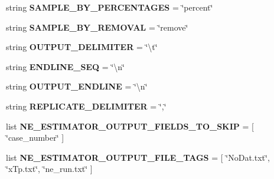\begin{DoxyCompactItemize}
\item 
string {\bfseries S\+A\+M\+P\+L\+E\+\_\+\+B\+Y\+\_\+\+P\+E\+R\+C\+E\+N\+T\+A\+G\+ES} = \char`\"{}percent\char`\"{}\hypertarget{namespacenegui_1_1pgdriveneestimator_a6ee69b369b673a4e1a4bd9538dd98416}{}\label{namespacenegui_1_1pgdriveneestimator_a6ee69b369b673a4e1a4bd9538dd98416}

\item 
string {\bfseries S\+A\+M\+P\+L\+E\+\_\+\+B\+Y\+\_\+\+R\+E\+M\+O\+V\+AL} = \char`\"{}remove\char`\"{}\hypertarget{namespacenegui_1_1pgdriveneestimator_a9ec6d87d70349dd43f33a16cfa7e68c0}{}\label{namespacenegui_1_1pgdriveneestimator_a9ec6d87d70349dd43f33a16cfa7e68c0}

\item 
string {\bfseries O\+U\+T\+P\+U\+T\+\_\+\+D\+E\+L\+I\+M\+I\+T\+ER} = \char`\"{}\textbackslash{}t\char`\"{}\hypertarget{namespacenegui_1_1pgdriveneestimator_a68b08075d6e1a58ae325c600881c9d6c}{}\label{namespacenegui_1_1pgdriveneestimator_a68b08075d6e1a58ae325c600881c9d6c}

\item 
string {\bfseries E\+N\+D\+L\+I\+N\+E\+\_\+\+S\+EQ} = \char`\"{}\textbackslash{}n\char`\"{}\hypertarget{namespacenegui_1_1pgdriveneestimator_aa8d38cb5ca07a3c1f89cd4c3d7cccb08}{}\label{namespacenegui_1_1pgdriveneestimator_aa8d38cb5ca07a3c1f89cd4c3d7cccb08}

\item 
string {\bfseries O\+U\+T\+P\+U\+T\+\_\+\+E\+N\+D\+L\+I\+NE} = \char`\"{}\textbackslash{}n\char`\"{}\hypertarget{namespacenegui_1_1pgdriveneestimator_a56a1a1d753221dfbed6ffc7cd58222f1}{}\label{namespacenegui_1_1pgdriveneestimator_a56a1a1d753221dfbed6ffc7cd58222f1}

\item 
string {\bfseries R\+E\+P\+L\+I\+C\+A\+T\+E\+\_\+\+D\+E\+L\+I\+M\+I\+T\+ER} = \char`\"{},\char`\"{}\hypertarget{namespacenegui_1_1pgdriveneestimator_a4a72408d1cee500503a7aa185253b438}{}\label{namespacenegui_1_1pgdriveneestimator_a4a72408d1cee500503a7aa185253b438}

\item 
list {\bfseries N\+E\+\_\+\+E\+S\+T\+I\+M\+A\+T\+O\+R\+\_\+\+O\+U\+T\+P\+U\+T\+\_\+\+F\+I\+E\+L\+D\+S\+\_\+\+T\+O\+\_\+\+S\+K\+IP} = \mbox{[} \char`\"{}case\+\_\+number\char`\"{} \mbox{]}\hypertarget{namespacenegui_1_1pgdriveneestimator_a77c91566694093f57286607ae144d35a}{}\label{namespacenegui_1_1pgdriveneestimator_a77c91566694093f57286607ae144d35a}

\item 
list {\bfseries N\+E\+\_\+\+E\+S\+T\+I\+M\+A\+T\+O\+R\+\_\+\+O\+U\+T\+P\+U\+T\+\_\+\+F\+I\+L\+E\+\_\+\+T\+A\+GS} = \mbox{[} \char`\"{}No\+Dat.\+txt\char`\"{}, \char`\"{}x\+Tp.\+txt\char`\"{}, \char`\"{}ne\+\_\+run.\+txt\char`\"{} \mbox{]}\hypertarget{namespacenegui_1_1pgdriveneestimator_a167fb016fbc3709c4c778c4a5157cd06}{}\label{namespacenegui_1_1pgdriveneestimator_a167fb016fbc3709c4c778c4a5157cd06}


\end{DoxyCompactItemize}
